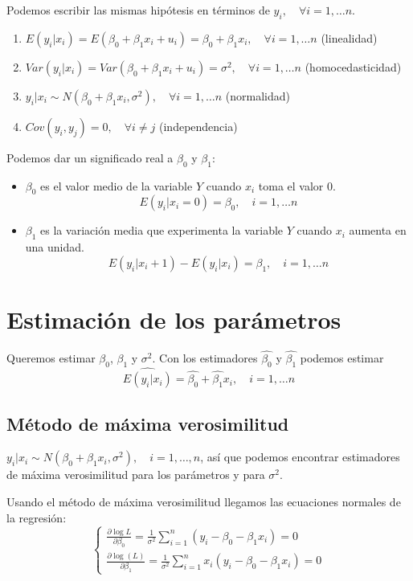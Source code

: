 \documentclass{report}
\theoremstyle{remark}
\theoremstyle{remark}
\theoremstyle{remark}
\theoremstyle{definition}
\theoremstyle{definition}
\theoremstyle{definition}
\begin{document}
Podemos escribir las mismas hipótesis en términos de $y_i, \quad \forall i = 1, \dots n$.
\begin{enumerate}
    \item $E(y_i | x_i) = E(\beta_0 + \beta_1x_i + u_i) = \beta_0 + \beta_1x_i, \quad \forall i = 1, \dots n$ (linealidad)
    \item $Var(y_i | x_i) = Var(\beta_0 + \beta_1x_i + u_i) = \sigma^2, \quad \forall i = 1, \dots n$ (homocedasticidad)
    \item $y_i | x_i \sim N(\beta_0 + \beta_1x_i, \sigma^2), \quad \forall i = 1, \dots n$ (normalidad)
    \item $Cov(y_i, y_j) = 0, \quad \forall i \neq j$ (independencia)
\end{enumerate}

Podemos dar un significado real a $\beta_0$ y $\beta_1$:
\begin{itemize}
    \item $\beta_0$ es el valor medio de la variable $Y$ cuando $x_i$ toma el valor 0.
          $$E(y_i | x_i = 0) = \beta_0, \quad i = 1, \dots n$$
    \item $\beta_1$ es la variación media que experimenta la variable $Y$ cuando $x_i$ aumenta en una unidad.
          $$E(y_i | x_i+1) - E(y_i | x_i) = \beta_1, \quad i = 1, \dots n$$
\end{itemize}

\section{Estimación de los parámetros}
Queremos estimar $\beta_0$, $\beta_1$ y $\sigma^2$.
Con los estimadores $\hat{\beta_0}$ y $\hat{\beta_1}$ podemos estimar $$\hat{E(y_i | x_i)} = \hat{\beta_0} + \hat{\beta_1}x_i, \quad i = 1, \dots n$$

\subsection*{Método de máxima verosimilitud}
$y_i | x_i \sim N(\beta_0 + \beta_1x_i, \sigma^2), \quad i = 1, \dots, n$, así que podemos encontrar estimadores de máxima verosimilitud para los parámetros y para $\sigma^2$.

Usando el método de máxima verosimilitud llegamos las ecuaciones normales de la regresión:
$$\begin{cases}
        \frac{\partial \log{L}}{\partial \beta_0} = \frac{1}{\sigma^2} \sum_{i=1}^n (y_i - \beta_0 - \beta_1x_i) = 0 \\
        \frac{\partial \log(L)}{\partial \beta_1} = \frac{1}{\sigma^2} \sum_{i=1}^n x_i(y_i - \beta_0 - \beta_1x_i) = 0
    \end{cases}$$
\end{document}
